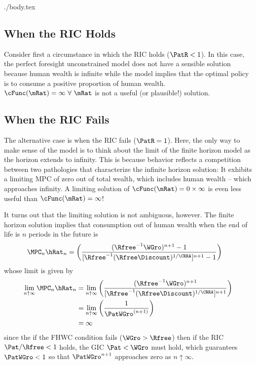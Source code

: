 \documentclass{handout}
\begin{document}
\begin{verbatimwrite}{./body.tex}
\subsection{When the RIC Holds}
Consider first a circumstance in which the RIC holds ($\PatR<1$).  In this case, the perfect foresight unconstrained model does not have a sensible solution because human wealth is infinite while the model implies that the optimal policy is to consume a positive proportion of human wealth.  $\cFunc(\mRat)=\infty~\forall~\mRat$ is not a useful (or plausible!) solution.

\subsection{When the RIC Fails}
The alternative case is when the RIC fails ($\PatR=1$).  Here, the only way to make sense of the model is to think about the limit of the finite horizon model as the horizon extends to infinity.  This is because behavior reflects a competition between two pathologies that characterize the infinite horizon solution:  It exhibits a limiting MPC of zero out of total wealth, which includes human wealth -- which approaches infinity.  A limiting solution of $\cFunc(\mRat) = 0 \times \infty$ is even less useful than $\cFunc(\mRat) = \infty$!  

It turns out that the limiting solution is not ambiguous, however.  The finite horizon solution implies that consumption out of human wealth when the end of life is $n$ periods in the future is 
\begin{equation}\begin{gathered}\begin{aligned}
  \MPC_{n} \hRat_{n} & =  \left(\frac{(\Rfree^{-1}{\WGro})^{{n}+1}-1}{[\Rfree^{-1}(\Rfree\Discount)^{1/\CRRA}]^{{n}+1}-1}\right) 
\end{aligned}\end{gathered}\end{equation}
whose limit is given by 
\begin{equation}\begin{gathered}\begin{aligned}
\lim_{{n} \uparrow \infty} \MPC_{n} \hRat_{n} & =  \lim_{n \uparrow \infty} \left(\frac{(\Rfree^{-1}{\WGro})^{{n}+1}}{[\Rfree^{-1}(\Rfree\Discount)^{1/\CRRA}]^{{n}+1}}\right)
\\ & =  \lim_{n \uparrow \infty} \left(\frac{1}{\PatWGro^{(n+1)}}\right)
\\ & =  \infty
\end{aligned}\end{gathered}\end{equation}
since the if the FHWC condition fails ($\WGro > \Rfree$) then if the RIC $\Pat/\Rfree < 1$ holds, the GIC $\Pat < \WGro$ must hold, which guarantees $\PatWGro < 1$ so that $\PatWGro^{n+1}$ approaches zero as $n \uparrow \infty.$


\end{verbatimwrite}
\end{document}
